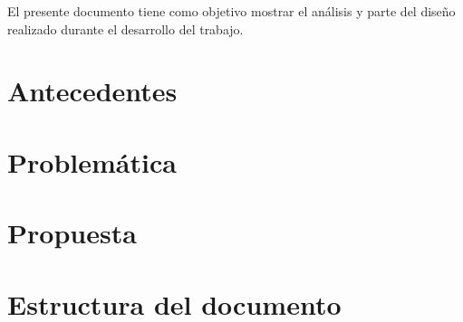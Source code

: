 El presente documento tiene como objetivo mostrar el análisis y parte del diseño realizado durante el desarrollo del trabajo.

\section{Antecedentes}

\section{Problemática}

\section{Propuesta}


\section{Estructura del documento}

